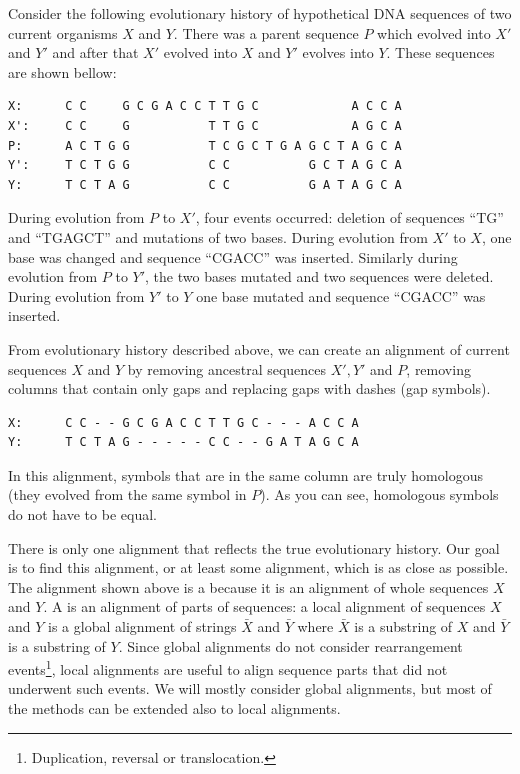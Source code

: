 \begin{example} 
Consider the  following evolutionary history of hypothetical DNA sequences of two
current organisms $X$ and $Y$. There was a parent sequence $P$ which evolved into
$X'$ and $Y'$ and after that $X'$ evolved into $X$ and $Y'$ evolves into $Y$.
These sequences are shown bellow: 
\begin{verbatim}
X:      C C     G C G A C C T T G C             A C C A
X':     C C     G           T T G C             A G C A
P:      A C T G G           T C G C T G A G C T A G C A
Y':     T C T G G           C C           G C T A G C A
Y:      T C T A G           C C           G A T A G C A
\end{verbatim}
During evolution from $P$ to $X'$, four events occurred: deletion of 
sequences ``TG''  and ``TGAGCT'' and mutations of two bases. During evolution
from $X'$ to $X$, one base was changed and sequence ``CGACC'' was inserted.  
Similarly during evolution from $P$ to $Y'$, the two bases mutated and two
sequences were deleted. During evolution from $Y'$ to $Y$ one base mutated and
sequence ``CGACC'' was inserted. 

From evolutionary history described above, we can create an alignment of current
sequences $X$ and $Y$ by removing ancestral sequences $X',Y'$ and $P$, 
removing columns that contain only gaps and
replacing gaps with dashes (gap symbols). 
\begin{verbatim}
X:      C C - - G C G A C C T T G C - - - A C C A
Y:      T C T A G - - - - - C C - - G A T A G C A
\end{verbatim}
In this alignment, symbols that are in the same column are truly homologous (they
evolved from the same symbol in $P$).
As you can see, homologous symbols do not have to be equal.
\end{example}

There is only one alignment that reflects the true evolutionary history. Our goal
is to find this alignment, or at least some alignment, which is as close as
possible. The alignment shown above is a  because it
is an alignment of whole sequences $X$ and $Y$. A 
is an alignment of parts of sequences: a local alignment of sequences $X$ and
$Y$ is a global alignment of strings $\bar{X}$ and $\bar{Y}$ where $\bar{X}$ is
a substring of $X$ and $\bar{Y}$ is a substring of $Y$.  Since global
alignments do not consider rearrangement events\footnote{Duplication, reversal
or translocation.}, local alignments are useful to align sequence parts that
did not underwent such events. We will mostly consider global alignments, but
most of the methods can be extended also to local alignments.

